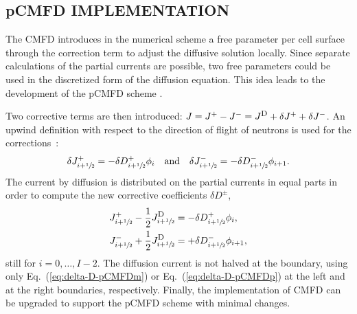 \documentclass[letterpaper]{physor2020}
\newcommand{\eq}[1]{Eq.~(\ref{#1})}
\newcommand{\jp}{\ensuremath{J^+}}
\newcommand{\jm}{\ensuremath{J^-}}
\newcommand{\jpm}{\ensuremath{J^\pm}}
\newcommand{\jD}{\ensuremath{J^{\textrm{\scriptsize{D}}}}}
\newcommand{\hzi}{\ensuremath{\sfrac{1}{2}}}
\begin{document}
\subsection{pCMFD IMPLEMENTATION}
\label{sec:RM-pCMFD}

The CMFD introduces in the numerical scheme a free parameter per cell surface through the correction term to adjust the diffusive solution locally. Since separate calculations of the partial currents are possible, two free parameters could be used in the discretized form of the diffusion equation. This idea leads to the development of the pCMFD scheme \cite{cho2003comparison}.

Two corrective terms are then introduced: $J = \jp - \jm = \jD + \delta J^+ + \delta J^-$. An upwind definition with respect to the direction of flight of neutrons is used for the corrections~\cite{Jarrett-2016,Zhu-2016}:
\begin{equation}
  \label{eq:CCF-sub}
  \delta \jp _{i+\hzi} = -\delta D^+ _{i+\hzi} \phi_i
  \quad \text{and} \quad
  \delta \jm _{i+\hzi} = -\delta D^- _{i+\hzi} \phi_{i+1}.
\end{equation}
The current by diffusion is distributed on the partial currents in equal parts in order to compute the new corrective coefficients $\delta D^{\pm}$,
\begin{subequations}
  \label{eq:delta-D-pCMFD}
  \begin{align}
    J^+_{i+\hzi} - \frac{1}{2}\jD_{i+\hzi} &= -\delta D^+_{i+\hzi} \phi_i, \label{eq:delta-D-pCMFDp}\\
    J^-_{i+\hzi} + \frac{1}{2}\jD_{i+\hzi} &= +\delta D^-_{i+\hzi} \phi_{i+1}, \label{eq:delta-D-pCMFDm}
  \end{align}
\end{subequations}
still for $i=0, \ldots, I-2$. The diffusion current is not halved at the boundary, using only \eq{eq:delta-D-pCMFDm} or \eq{eq:delta-D-pCMFDp} at the left and at the right boundaries, respectively. Finally, the implementation of CMFD can be upgraded to support the pCMFD scheme with minimal changes.
%
%
\end{document}
